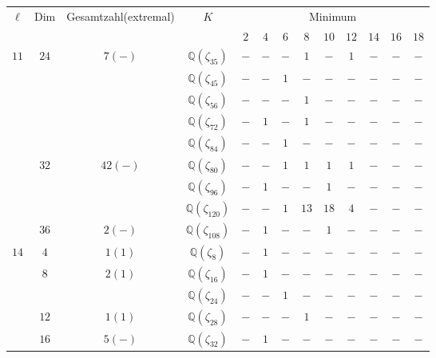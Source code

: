 \documentclass[12pt,a4paper,halfparskip,headsepline,bibtotocnumbered]{scrreprt}
\theoremstyle{nummermitklammern}
\theoremstyle{nonumberbreak}
\newcommand{\Q}{\mathbb{Q}}
\begin{document}
\begin{table}
	\centering
	\begin{tabular}{|c|c|c|c|c|c|c|c|c|c|c|c|c|}
		\hline		
		\multirow{2}{*}{$\ell$}	&\multirow{2}{*}{Dim}	&\multirow{2}{*}{Gesamtzahl(extremal)}	&\multirow{2}{*}{$K$}	&\multicolumn{9}{c|}{Minimum}\\ \cline{5-13}
								&						&							&					&$2$	&$4$	&$6$	&$8$	&$10$	&$12$	&$14$	&$16$	&$18$\\ \hline
		\multirow{9}{*}{$11$}	&\multirow{5}{*}{$24$}	&\multirow{5}{*}{$7(-)$}	&$\Q(\zeta_{35})$	&$-$	&$-$	&$-$	&$1$	&$-$	&$1$	&$-$	&$-$	&$-$\\ \cline{4-13}
								&						&							&$\Q(\zeta_{45})$	&$-$	&$-$	&$1$	&$-$	&$-$	&$-$	&$-$	&$-$	&$-$\\ \cline{4-13}
								&						&							&$\Q(\zeta_{56})$	&$-$	&$-$	&$-$	&$1$	&$-$	&$-$	&$-$	&$-$	&$-$\\ \cline{4-13}
								&						&							&$\Q(\zeta_{72})$	&$-$	&$1$	&$-$	&$1$	&$-$	&$-$	&$-$	&$-$	&$-$\\ \cline{4-13}
								&						&							&$\Q(\zeta_{84})$	&$-$	&$-$	&$1$	&$-$	&$-$	&$-$	&$-$	&$-$	&$-$\\ \cline{2-13}
								&\multirow{3}{*}{$32$}	&\multirow{3}{*}{$42(-)$}	&$\Q(\zeta_{80})$	&$-$	&$-$	&$1$	&$1$	&$1$	&$1$	&$-$	&$-$	&$-$\\ \cline{4-13}
								&						&							&$\Q(\zeta_{96})$	&$-$	&$1$	&$-$	&$-$	&$1$	&$-$	&$-$	&$-$	&$-$\\ \cline{4-13}
								&						&							&$\Q(\zeta_{120})$	&$-$	&$-$	&$1$	&$13$	&$18$	&$4$	&$-$	&$-$	&$-$\\ \cline{2-13}
								&$36$					&$2(-)$						&$\Q(\zeta_{108})$	&$-$	&$1$	&$-$	&$-$	&$1$	&$-$	&$-$	&$-$	&$-$\\ \hline
		\multirow{10}{*}{$14$}	&$4$					&$1(1)$						&$\Q(\zeta_{8})$	&$-$	&$1$	&$-$	&$-$	&$-$	&$-$	&$-$	&$-$	&$-$\\ \cline{2-13}
								&\multirow{2}{*}{$8$}	&\multirow{2}{*}{$2(1)$}	&$\Q(\zeta_{16})$	&$-$	&$1$	&$-$	&$-$	&$-$	&$-$	&$-$	&$-$	&$-$\\ \cline{4-13}
								&						&							&$\Q(\zeta_{24})$	&$-$	&$-$	&$1$	&$-$	&$-$	&$-$	&$-$	&$-$	&$-$\\ \cline{2-13}
								&$12$					&$1(1)$						&$\Q(\zeta_{28})$	&$-$	&$-$	&$-$	&$1$	&$-$	&$-$	&$-$	&$-$	&$-$\\ \cline{2-13}
								&\multirow{4}{*}{$16$}	&\multirow{4}{*}{$5(-)$}	&$\Q(\zeta_{32})$	&$-$	&$1$	&$-$	&$-$	&$-$	&$-$	&$-$	&$-$	&$-$\\ \cline{4-13}

\end{tabular}
\end{table}
\end{document}
